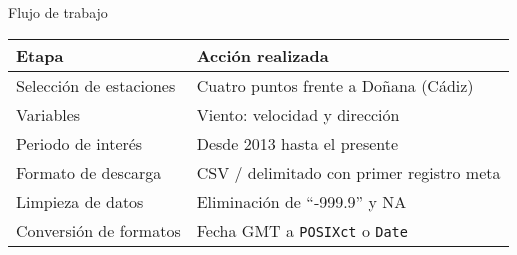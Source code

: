 \documentclass[
]{article}
\begin{document}
Flujo de trabajo

\begin{longtable}[]{@{}
  >{\raggedright\arraybackslash}p{}
  >{\raggedright\arraybackslash}p{}@{}}
\toprule\noalign{}
\begin{minipage}[b]{\linewidth}\raggedright
Etapa
\end{minipage} & \begin{minipage}[b]{\linewidth}\raggedright
Acción realizada
\end{minipage} \\
\midrule\noalign{}
\endhead
\bottomrule\noalign{}
\endlastfoot
Selección de estaciones & Cuatro puntos frente a Doñana (Cádiz) \\
Variables & Viento: velocidad y dirección \\
Periodo de interés & Desde 2013 hasta el presente \\
Formato de descarga & CSV / delimitado con primer registro meta \\
Limpieza de datos & Eliminación de ``‑999.9'' y NA \\
Conversión de formatos & Fecha GMT a \texttt{POSIXct} o \texttt{Date} \\
\end{longtable}
\end{document}
